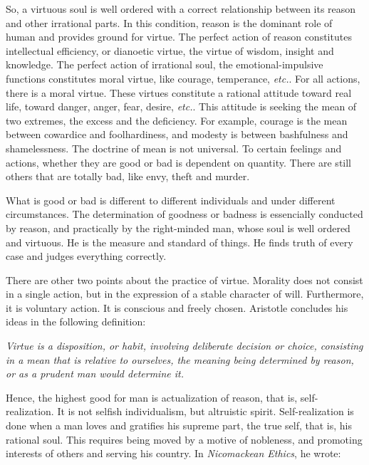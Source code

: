 \documentclass[11pt]{article}
\begin{document}
\newline

So, a virtuous soul is well ordered with a correct relationship between its reason and other irrational parts. 
In this condition, reason is the dominant role of human and provides ground for virtue. 
The perfect action of reason constitutes intellectual efficiency, or dianoetic virtue, the virtue of wisdom, insight and knowledge. 
The perfect action of irrational soul, the emotional-impulsive functions constitutes moral virtue, like courage, temperance, \textit{etc.}. 
For all actions, there is a moral virtue. 
These virtues constitute a rational attitude toward real life, toward danger, anger, fear, desire, \textit{etc.}. 
This attitude is seeking the mean of two extremes, the excess and the deficiency. 
For example, courage is the mean between cowardice and foolhardiness, and modesty is between bashfulness and shamelessness. 
The doctrine of mean is not universal. 
To certain feelings and actions, whether they are good or bad is dependent on quantity. 
There are still others that are totally bad, like envy, theft and murder.

\newline

What is good or bad is different to different individuals and under different circumstances. 
The determination of goodness or badness is essencially conducted by reason, and practically by the right-minded man, whose soul is well ordered and virtuous. 
He is the measure and standard of things. 
He finds truth of every case and judges everything correctly. 

\newline

There are other two points about the practice of virtue. 
Morality does not consist in a single action, but in the expression of a stable character of will. 
Furthermore, it is voluntary action. 
It is conscious and freely chosen. 
Aristotle concludes his ideas in the following definition:

\textit{Virtue is a disposition, or habit, involving deliberate decision or choice, consisting in a mean that is relative to ourselves, the meaning being determined by reason, or as a prudent man would determine it.}

\newline

Hence, the highest good for man is actualization of reason, that is, self-realization. 
It is not selfish individualism, but altruistic spirit. 
Self-realization is done when a man loves and gratifies his supreme part, the true self, that is, his rational soul. 
This requires being moved by a motive of nobleness, and promoting interests of others and serving his country. 
In \textit{Nicomackean Ethics}, he wrote:
  
\end{document}
